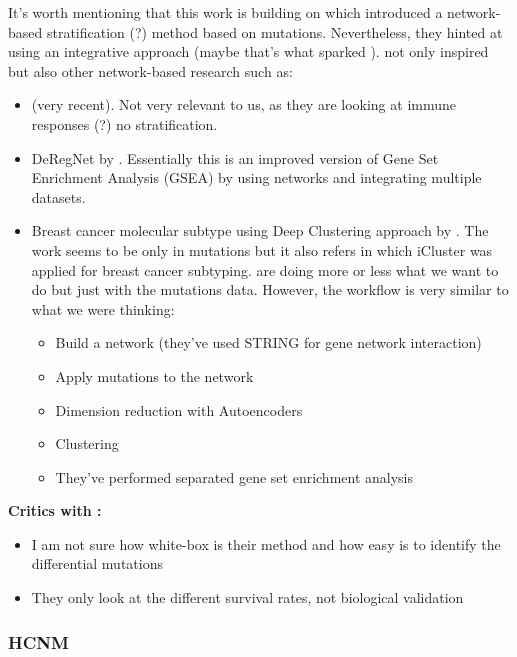 It's worth mentioning that this work is building on \citet{Hofree2013-ld} which introduced a network-based stratification (?) method based on mutations. Nevertheless, they hinted at using an integrative approach (maybe that's what sparked \citet{He2017-dj}). \citet{Hofree2013-ld} not only inspired \citet{He2017-dj} but also other network-based research such as:
\begin{itemize}
    \item \citet{Kong2022-gv} (very recent). Not very relevant to us, as they are looking at immune responses (?) no stratification.
     \item DeRegNet by \citet{Winkler2022-vg}. Essentially this is an improved version of Gene Set Enrichment Analysis (GSEA) by using networks and integrating multiple datasets.
     \item Breast cancer molecular subtype using Deep Clustering approach by \citet{Rohani2020-px}. The work seems to be only in mutations but it also refers \citet{Curtis2012-ff} in which iCluster was applied for breast cancer subtyping. \citet{Rohani2020-px} are doing more or less what we want to do but just with the mutations data. However, the workflow is very similar to what we were thinking:
     \begin{itemize}
         \item Build a network (they've used STRING for gene network interaction)
         \item Apply mutations to the network
         \item Dimension reduction with Autoencoders
         \item Clustering
         \item They've performed separated gene set enrichment analysis
     \end{itemize}
\end{itemize}

\textbf{Critics with \citet{He2017-dj}:}
\begin{itemize}
    \item I am not sure how white-box is their method and how easy is to identify the differential mutations
    \item They only look at the different survival rates, not biological validation
\end{itemize}




\subsubsection{HCNM}

